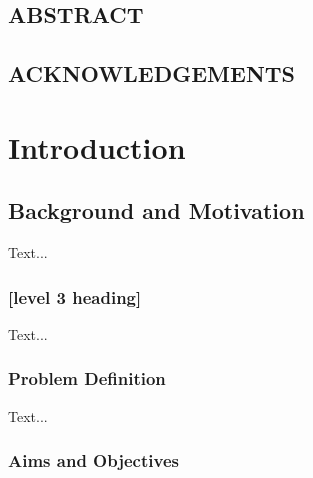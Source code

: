 \documentclass[12pt,a4paper]{report}
\begin{document}

\newpage \section*{ABSTRACT}


\newpage \section*{ACKNOWLEDGEMENTS}



\tableofcontents

\thispagestyle{empty}


\chapter{Introduction}

\setcounter{page}{1}



\section{Background and Motivation}


Text...

\subsection{[level 3 heading]}




Text...

\subsection{Problem Definition}


Text...

\subsection{Aims and Objectives}
\end{document}
